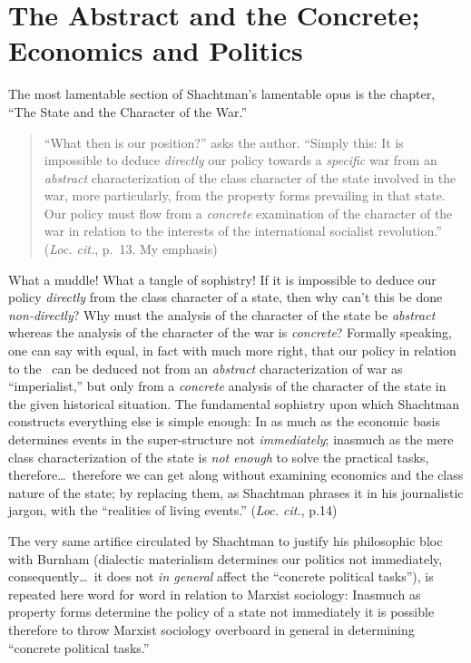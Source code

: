 \section*{The Abstract and the Concrete; Economics and Politics}

The most lamentable section of Shachtman’s lamentable opus is the chapter, ``The State and the Character of the War.''
\begin{quote}
  “What then is our position?” asks the author. “Simply this: It is impossible to deduce \emph{directly} our policy towards a \emph{specific} war from an \emph{abstract} characterization of the class character of the state involved in the war, more particularly, from the property forms prevailing in that state. Our policy must flow from a \emph{concrete} examination of the character of the war in relation to the interests of the international socialist revolution.” (\emph{Loc. cit.}, p.~13. My emphasis)
\end{quote}
What a muddle! What a tangle of sophistry! If it is impossible to deduce our policy \emph{directly} from the class character of a state, then why can’t this be done \emph{non-directly}? Why must the analysis of the character of the state be \emph{abstract} whereas the analysis of the character of the war is \emph{concrete}? Formally speaking, one can say with equal, in fact with much more right, that our policy in relation to the \USSR\ can be deduced not from an \emph{abstract} characterization of war as “imperialist,” but only from a \emph{concrete} analysis of the character of the state in the given historical situation. The fundamental sophistry upon which Shachtman constructs everything else is simple enough: In as much as the economic basis determines events in the super-structure not \emph{immediately}; inasmuch as the mere class characterization of the state is \emph{not enough} to solve the practical tasks, therefore\dots\ therefore we can get along without examining economics and the class nature of the state; by replacing them, as Shachtman phrases it in his journalistic jargon, with the “realities of living events.” (\emph{Loc. cit.}, p.14)

The very same artifice circulated by Shachtman to justify his philosophic bloc with Burnham (dialectic materialism determines our politics not immediately, consequently\dots\ it does not \emph{in general} affect the “concrete political tasks”), is repeated here word for word in relation to Marxist sociology: Inasmuch as property forms determine the policy of a state not immediately it is possible therefore to throw Marxist sociology overboard in general in determining “concrete political tasks.”

